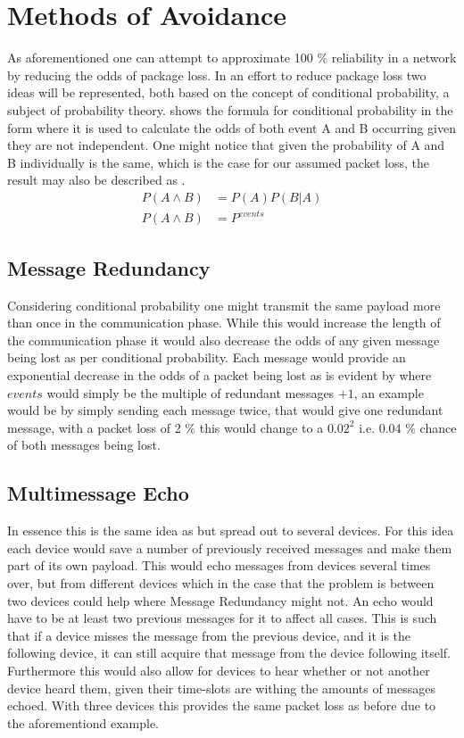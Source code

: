 \section{Methods of Avoidance}
As aforementioned one can attempt to approximate 100 \% reliability in a network by reducing the odds of package loss.
In an effort to reduce package loss two ideas will be represented, both based on the concept of conditional probability, a subject of probability theory.
 shows the formula for conditional probability in the form where it is used to calculate the odds of both event A and B occurring given they are not independent.
One might notice that given the probability of A and B individually is the same, which is the case for our assumed packet loss, the result may also be described as .
\begin{align}
P(A \land B) &= P(A)P(B|A) \label{eq:conditionalProb} \\  
P(A \land B) &= P^{events} \label{eq:conditionalProb2}
\end{align}

\subsection{Message Redundancy}\label{redundancy}
Considering conditional probability one might transmit the same payload more than once in the communication phase.
While this would increase the length of the communication phase it would also decrease the odds of any given message being lost as per conditional probability.
Each message would provide an exponential decrease in the odds of a packet being lost as is evident by  where $events$ would simply be the multiple of redundant messages $+ 1$, an example would be by simply sending each message twice, that would give one redundant message, with a packet loss of 2 \% this would change to a $0.02^2$ i.e. 0.04 \% chance of both messages being lost.

\subsection{Multimessage Echo}
In essence this is the same idea as  but spread out to several devices.
For this idea each device would save a number of previously received messages and make them part of its own payload.
This would echo messages from devices several times over, but from different devices which in the case that the problem is between two devices could help where Message Redundancy might not.
An echo would have to be at least two previous messages for it to affect all cases.
This is such that if a device misses the message from the previous device, and it is the following device, it can still acquire that message from the device following itself.
Furthermore this would also allow for devices to hear whether or not another device heard them, given their time-slots are withing the amounts of messages echoed.
With three devices this provides the same packet loss as before due to the aforementiond example.